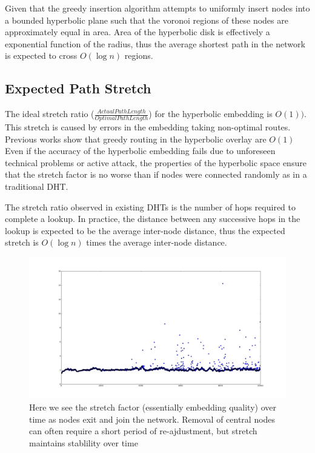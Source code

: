 Given that the greedy insertion algorithm attempts to uniformly insert nodes into a bounded hyperbolic plane such that the voronoi regions of these nodes are approximately equal in area.
Area of the hyperbolic disk is effectively a exponential function of the radius, thus the average shortest path in the network is expected to cross $O(\log{n})$ regions.

\subsection{Expected Path Stretch}

The ideal stretch ratio ($\frac{\mathit{Actual Path Length}}{\mathit{Optimal Path Length}}$) for the hyperbolic embedding is $O(1))$.
This stretch is caused by errors in the embedding taking non-optimal routes.
Previous works show that greedy routing in the hyperbolic overlay are $O(1)$
Even if the accuracy of the hyperbolic embedding fails due to unforeseen technical problems or active attack, the properties of the hyperbolic space ensure that the stretch factor is no worse than if nodes were connected randomly as in a traditional DHT.

The stretch ratio observed in existing DHTs is the number of hops required to complete a lookup.
In practice, the distance between any successive hops in the lookup is expected to be the average inter-node distance, thus the expected stretch is $O(\log{n})$ times the average inter-node distance. 

\begin{figure}[H]
	\includegraphics[width=\textwidth]{churn_stretch}
	\caption{Here we see the stretch factor (essentially embedding quality) over time as nodes exit and join the network. Removal of central nodes can often require a short period of re-ajdustment, but stretch maintains stablility over time}
\end{figure}


